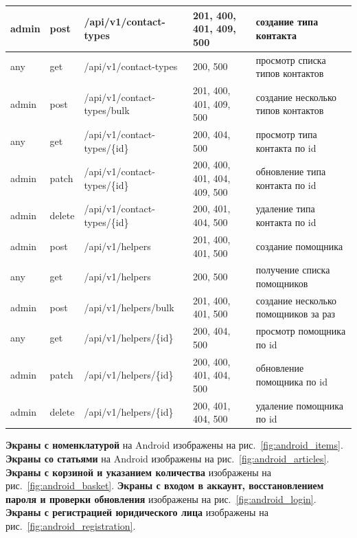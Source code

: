 \begin{table}
\begin{tabular}{|p{1cm}|p{1cm}|p{8.5cm}|p{4.8cm}|p{8.5cm}|}
        admin & post & /api/v1/contact-types & 201, 400, 401, 409, 500 & создание типа контакта \\ \hline 
        any & get & /api/v1/contact-types & 200, 500 & просмотр списка типов контактов \\ \hline 
        admin & post & /api/v1/contact-types/bulk & 201, 400, 401, 409, 500 & создание несколько типов контактов \\ \hline 
        any & get & /api/v1/contact-types/\{id\} & 200, 404, 500 & просмотр типа контакта по id \\ \hline 
        admin & patch & /api/v1/contact-types/\{id\} & 200, 400, 401, 404, 409, 500 & обновление типа контакта по id \\ \hline 
        admin & delete & /api/v1/contact-types/\{id\} & 200, 401, 404, 500 & удаление типа контакта по id \\ \hline 
        admin & post & /api/v1/helpers & 201, 400, 401, 500 & создание помощника \\ \hline 
        any & get & /api/v1/helpers & 200, 500 & получение списка помощников \\ \hline 
        admin & post & /api/v1/helpers/bulk & 201, 400, 401, 500 & создание несколько помощников за раз \\ \hline 
        any & get & /api/v1/helpers/\{id\} & 200, 404, 500 & просмотр помощника по id \\ \hline 
        admin & patch & /api/v1/helpers/\{id\} & 200, 400, 401, 404, 500 & обновление помощника по id \\ \hline 
        admin & delete & /api/v1/helpers/\{id\} & 200, 401, 404, 500 & удаление помощника по id \\ \hline 
    \end{tabular}
\end{table}

\textbf{Экраны с номенклатурой} на Android изображены на рис.~\ref{fig:android_items}.
\textbf{Экраны со статьями} на Android изображены на рис.~\ref{fig:android_articles}.
\textbf{Экраны с корзиной и указанием количества} изображены на рис.~\ref{fig:android_basket}.
\textbf{Экраны с входом в аккаунт, восстановлением пароля и проверки обновления} изображены на рис.~\ref{fig:android_login}.
\textbf{Экраны с регистрацией юридического лица} изображены на рис.~\ref{fig:android_registration}.

